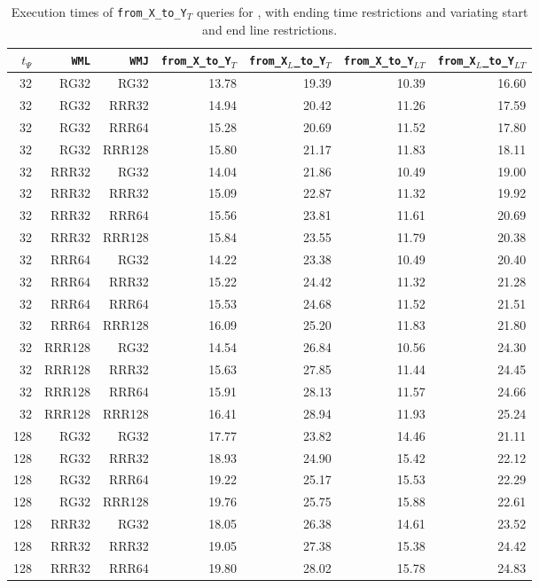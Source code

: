 \begin{table}
\caption{Execution times of \texttt{from\_X\_to\_Y$_T$} queries for \ctr, with ending time restrictions and variating start and end line restrictions.}
\begin{tabular}{|r|r|r|r|r|r|r|}
\hline
$t_{\Psi}$ & \texttt{WML} & \texttt{WMJ} & \texttt{from\_X\_to\_Y$_{T}$} & \texttt{from\_X$_{L}$\_to\_Y$_{T}$} & \texttt{from\_X\_to\_Y$_{LT}$} & \texttt{from\_X$_{L}$\_to\_Y$_{LT}$} \\
\hline
32 & RG32 & RG32 & 13.78 & 19.39 & 10.39 & 16.60 \\
32 & RG32 & RRR32 & 14.94 & 20.42 & 11.26 & 17.59 \\
32 & RG32 & RRR64 & 15.28 & 20.69 & 11.52 & 17.80 \\
32 & RG32 & RRR128 & 15.80 & 21.17 & 11.83 & 18.11 \\
32 & RRR32 & RG32 & 14.04 & 21.86 & 10.49 & 19.00 \\
32 & RRR32 & RRR32 & 15.09 & 22.87 & 11.32 & 19.92 \\
32 & RRR32 & RRR64 & 15.56 & 23.81 & 11.61 & 20.69 \\
32 & RRR32 & RRR128 & 15.84 & 23.55 & 11.79 & 20.38 \\
32 & RRR64 & RG32 & 14.22 & 23.38 & 10.49 & 20.40 \\
32 & RRR64 & RRR32 & 15.22 & 24.42 & 11.32 & 21.28 \\
32 & RRR64 & RRR64 & 15.53 & 24.68 & 11.52 & 21.51 \\
32 & RRR64 & RRR128 & 16.09 & 25.20 & 11.83 & 21.80 \\
32 & RRR128 & RG32 & 14.54 & 26.84 & 10.56 & 24.30 \\
32 & RRR128 & RRR32 & 15.63 & 27.85 & 11.44 & 24.45 \\
32 & RRR128 & RRR64 & 15.91 & 28.13 & 11.57 & 24.66 \\
32 & RRR128 & RRR128 & 16.41 & 28.94 & 11.93 & 25.24 \\
128 & RG32 & RG32 & 17.77 & 23.82 & 14.46 & 21.11 \\
128 & RG32 & RRR32 & 18.93 & 24.90 & 15.42 & 22.12 \\
128 & RG32 & RRR64 & 19.22 & 25.17 & 15.53 & 22.29 \\
128 & RG32 & RRR128 & 19.76 & 25.75 & 15.88 & 22.61 \\
128 & RRR32 & RG32 & 18.05 & 26.38 & 14.61 & 23.52 \\
128 & RRR32 & RRR32 & 19.05 & 27.38 & 15.38 & 24.42 \\
128 & RRR32 & RRR64 & 19.80 & 28.02 & 15.78 & 24.83 \\

\end{tabular}
\end{table}
